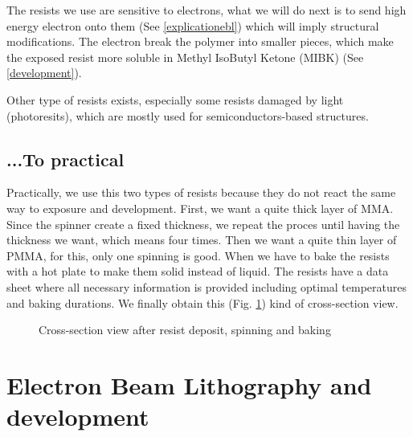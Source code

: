             The resists we use are sensitive to electrons, what we will do next is to send high energy electron onto them (See \ref{explicationebl}) which will imply structural modifications. The electron break the polymer into smaller pieces, which make the exposed resist more soluble in Methyl IsoButyl Ketone (MIBK) (See \ref{development}).
            
              Other type of resists exists, especially some resists damaged by light (photoresits), which are mostly used for semiconductors-based structures.
                          
        \subsection{...To practical}
        
            Practically, we use this two types of resists because they do not react the same way to exposure and development. First, we want a quite thick layer of MMA. Since the spinner create a fixed thickness, we repeat the proces until having the thickness we want, which means four times. Then we want a quite thin layer of PMMA, for this, only one spinning is good. When we have to bake the resists with a hot plate to make them solid instead of liquid. The resists have a data sheet where all necessary information is provided including optimal temperatures and baking durations. We finally obtain this (Fig. \ref{resine}) kind of cross-section view.
            
            \begin{figure}[H]
                \centering 
                \caption{Cross-section view after resist deposit, spinning and baking}
                \label{resine}
            \end{figure}
            
    \section{Electron Beam Lithography and development}
        
